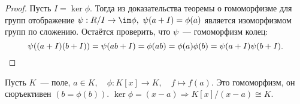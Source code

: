 	\begin{proof}
		Пусть ${I = \ker \phi.}$ Тогда из доказательства теоремы о гомоморфизме для групп отображение ${\psi: R/I \rightarrow \im \phi, \ \psi(a + I) = \phi(a)}$ является изоморфизмом групп по сложению.\n
		Остаётся проверить, что $\psi$~--- гомоморфизм колец:
		\begin{equation*}
			\psi((a + I)(b + I)) = \psi(ab + I) = \phi(ab) = \phi(a)\phi(b) = \psi(a + I)\psi(b + I). \qedhere
		\end{equation*}
	\end{proof}
	\begin{exmpl*}
		Пусть $K$~--- поле, ${a \in K, \quad \phi: K[x] \rightarrow K, \quad f \mapsto f(a).}$ \n
		Это гомоморфизм, он сюръективен ${(b = \phi(b)).}$ \n
		$\ker \phi = (x - a) \Rightarrow K[x]/(x - a) \cong K.$
	\end{exmpl*}
